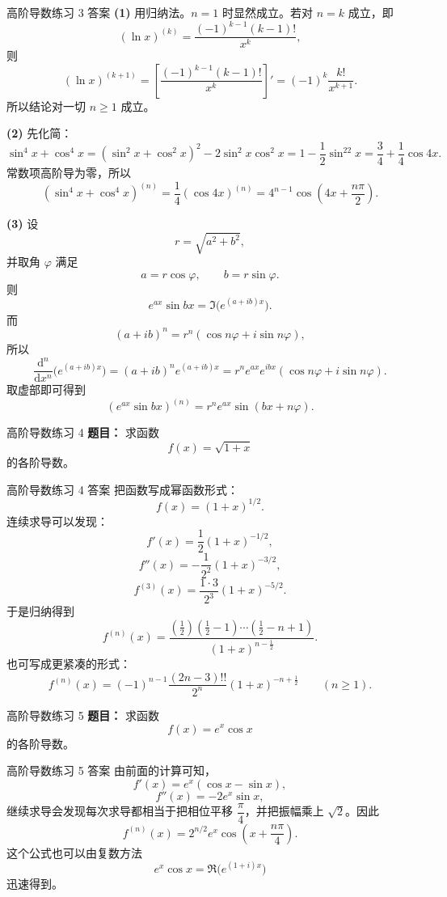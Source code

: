 ﻿\documentclass[aspectratio=169,11pt]{ctexbeamer}
\begin{document}
\begin{frame}[allowframebreaks]{高阶导数练习 3 答案}
\small
\textbf{(1)} 用归纳法。$n=1$ 时显然成立。若对 $n=k$ 成立，即
\[
(\ln x)^{(k)}=\frac{(-1)^{k-1}(k-1)!}{x^k},
\]
则
\[
(\ln x)^{(k+1)}=\left[\frac{(-1)^{k-1}(k-1)!}{x^k}\right]'
=(-1)^k\frac{k!}{x^{k+1}}.
\]
所以结论对一切 $n\ge1$ 成立。

\textbf{(2)} 先化简：
\[
\sin^4x+\cos^4x
=(\sin^2x+\cos^2x)^2-2\sin^2x\cos^2x
=1-\frac12\sin^22x
=\frac34+\frac14\cos4x.
\]
常数项高阶导为零，所以
\[
(\sin^4x+\cos^4x)^{(n)}
=\frac14(\cos4x)^{(n)}
=4^{n-1}\cos\left(4x+\frac{n\pi}{2}\right).
\]

\textbf{(3)} 设
\[
r=\sqrt{a^2+b^2},
\]
并取角 $\varphi$ 满足
\[
a=r\cos\varphi,\qquad b=r\sin\varphi.
\]
则
\[
e^{ax}\sin bx=\Im\bigl(e^{(a+ib)x}\bigr).
\]
而
\[
(a+ib)^n=r^n(\cos n\varphi+i\sin n\varphi),
\]
所以
\[
\frac{\mathrm d^n}{\mathrm dx^n}\bigl(e^{(a+ib)x}\bigr)=(a+ib)^ne^{(a+ib)x}
=r^ne^{ax}e^{ibx}(\cos n\varphi+i\sin n\varphi).
\]
取虚部即可得到
\[
(e^{ax}\sin bx)^{(n)}=r^ne^{ax}\sin(bx+n\varphi).
\]
\end{frame}

\begin{frame}{高阶导数练习 4}
\small
\textbf{题目：} 求函数
\[
f(x)=\sqrt{1+x}
\]
的各阶导数。
\end{frame}

\begin{frame}{高阶导数练习 4 答案}
\small
把函数写成幂函数形式：
\[
f(x)=(1+x)^{1/2}.
\]
连续求导可以发现：
\[
f'(x)=\frac12(1+x)^{-1/2},
\]
\[
f''(x)=-\frac1{2^2}(1+x)^{-3/2},
\]
\[
f^{(3)}(x)=\frac{1\cdot3}{2^3}(1+x)^{-5/2}.
\]
于是归纳得到
\[
f^{(n)}(x)=\frac{\left(\frac12\right)\left(\frac12-1\right)\cdots\left(\frac12-n+1\right)}{(1+x)^{n-\frac12}}.
\]
也可写成更紧凑的形式：
\[
f^{(n)}(x)=(-1)^{n-1}\frac{(2n-3)!!}{2^n}(1+x)^{-n+\frac12}\qquad (n\ge1).
\]
\end{frame}

\begin{frame}{高阶导数练习 5}
\small
\textbf{题目：} 求函数
\[
f(x)=e^x\cos x
\]
的各阶导数。
\end{frame}

\begin{frame}{高阶导数练习 5 答案}
\small
由前面的计算可知，
\[
f'(x)=e^x(\cos x-\sin x),
\]
\[
f''(x)=-2e^x\sin x,
\]
继续求导会发现每次求导都相当于把相位平移 $\dfrac{\pi}{4}$，并把振幅乘上 $\sqrt2$。因此
\[
f^{(n)}(x)=2^{n/2}e^x\cos\left(x+\frac{n\pi}{4}\right).
\]
这个公式也可以由复数方法
\[
e^x\cos x=\Re\bigl(e^{(1+i)x}\bigr)
\]
迅速得到。
\end{frame}
\end{document}
